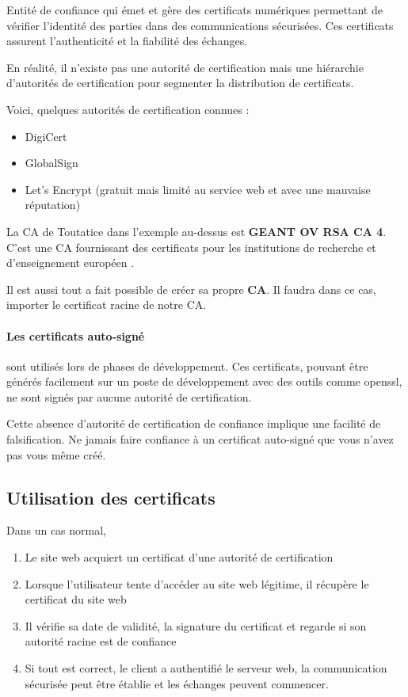 \documentclass[french, 12pt]{article}%
\newcommand{\itemE}{\item[$\bullet$]}
\newcommand{\titreencadre}{Titre}
\newenvironment{encadre}[1]{\renewcommand{\titreencadre}{#1}
	\begin{mdframed}[style=encadrestyle]
	\vspace{0.5\baselineskip}
	}{%
	\end{mdframed}}
\begin{document}
\begin{encadre}{Autorité de certification (ou CA)}
Entité de confiance qui émet et gère des certificats numériques permettant de vérifier l'identité des parties dans des communications sécurisées. Ces certificats assurent l'authenticité et la fiabilité des échanges.
\end{encadre}

En réalité, il n'existe pas une autorité de certification mais une hiérarchie d'autorités de certification pour segmenter la distribution de certificats. 

Voici, quelques autorités de certification connues : 
\begin{itemize}
\itemE DigiCert
\itemE GlobalSign
\itemE Let's Encrypt (gratuit mais limité au service web et avec une mauvaise réputation)
\end{itemize}

La CA de Toutatice dans l'exemple au-dessus est  \textbf{GEANT OV RSA CA 4}. C'est une CA fournissant des certificats pour les institutions de recherche et d'enseignement européen .

\vspace{0.5cm}

Il est aussi tout a fait possible de créer sa propre \textbf{CA}. Il faudra dans ce cas, importer le certificat racine de notre CA. 



\paragraph{Les certificats auto-signé} sont utilisés lors de phases de développement. Ces certificats, pouvant être générés facilement sur un poste de développement avec des outils comme openssl, ne sont signés par aucune autorité de certification.

Cette absence d’autorité de certification de confiance implique une facilité de falsification. Ne jamais faire confiance à un certificat auto-signé que vous n’avez pas vous même créé.


\subsection{Utilisation des certificats}

Dans un cas normal, 
\begin{enumerate}
\item Le site web acquiert un certificat d’une autorité de certification
\item Lorsque l'utilisateur tente d'accéder au site web légitime, il récupère le certificat du site web
\item Il vérifie sa date de validité, la signature du certificat et regarde si son autorité racine est de confiance
\item Si tout est correct, le client a authentifié le serveur web, la communication sécurisée peut être établie et les échanges peuvent commencer.
\end{enumerate}
\end{document}
